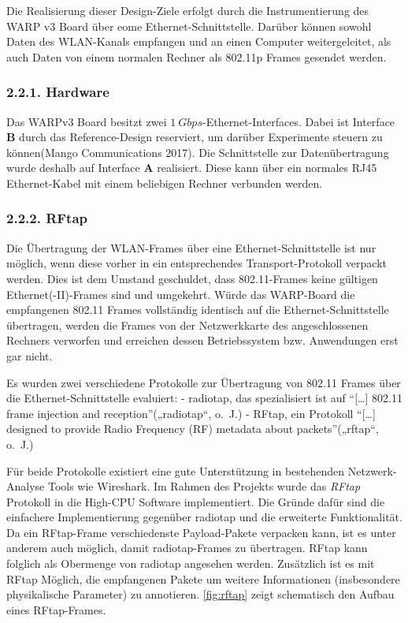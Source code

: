\documentclass[ngerman,]{scrartcl}
\begin{document}
Die Realisierung dieser Design-Ziele erfolgt durch die Instrumentierung
des WARP v3 Board über eome Ethernet-Schnittstelle. Darüber können
sowohl Daten des WLAN-Kanals empfangen und an einen Computer
weitergeleitet, als auch Daten von einem normalen Rechner als 802.11p
Frames gesendet werden.

\subsubsection{2.2.1. Hardware}\label{hardware}

Das WARPv3 Board besitzt zwei \(\SI{1}{Gbps}\)-Ethernet-Interfaces.
Dabei ist Interface \textbf{B} durch das Reference-Design reserviert, um
darüber Experimente steuern zu können(Mango Communications 2017). Die
Schnittstelle zur Datenübertragung wurde deshalb auf Interface
\textbf{A} realisiert. Diese kann über ein normales RJ45 Ethernet-Kabel
mit einem beliebigen Rechner verbunden werden.

\subsubsection{2.2.2. RFtap}\label{rftap}

Die Übertragung der WLAN-Frames über eine Ethernet-Schnittstelle ist nur
möglich, wenn diese vorher in ein entsprechendes Transport-Protokoll
verpackt werden. Dies ist dem Umstand geschuldet, dass 802.11-Frames
keine gültigen Ethernet(-II)-Frames sind und umgekehrt. Würde das
WARP-Board die empfangenen 802.11 Frames vollständig identisch auf die
Ethernet-Schnittstelle übertragen, werden die Frames von der
Netzwerkkarte des angeschlossenen Rechners verworfen und erreichen
dessen Betriebssystem bzw. Anwendungen erst gar nicht.

Es wurden zwei verschiedene Protokolle zur Übertragung von 802.11 Frames
über die Ethernet-Schnittstelle evaluiert: - radiotap, das spezialisiert
ist auf ``{[}\ldots{}{]} 802.11 frame injection and
reception''(„radiotap``, o.~J.) - RFtap, ein Protokoll ``{[}\ldots{}{]}
designed to provide Radio Frequency (RF) metadata about
packets''(„rftap``, o.~J.)

Für beide Protokolle existiert eine gute Unterstützung in bestehenden
Netzwerk-Analyse Tools wie Wireshark. Im Rahmen des Projekts wurde das
\emph{RFtap} Protokoll in die High-CPU Software implementiert. Die
Gründe dafür sind die einfachere Implementierung gegenüber radiotap und
die erweiterte Funktionalität. Da ein RFtap-Frame verschiedenste
Payload-Pakete verpacken kann, ist es unter anderem auch möglich, damit
radiotap-Frames zu übertragen. RFtap kann folglich als Obermenge von
radiotap angesehen werden. Zusätzlich ist es mit RFtap Möglich, die
empfangenen Pakete um weitere Informationen (insbesondere physikalische
Parameter) zu annotieren. \cref{fig:rftap} zeigt
schematisch den Aufbau eines RFtap-Frames.
\end{document}

